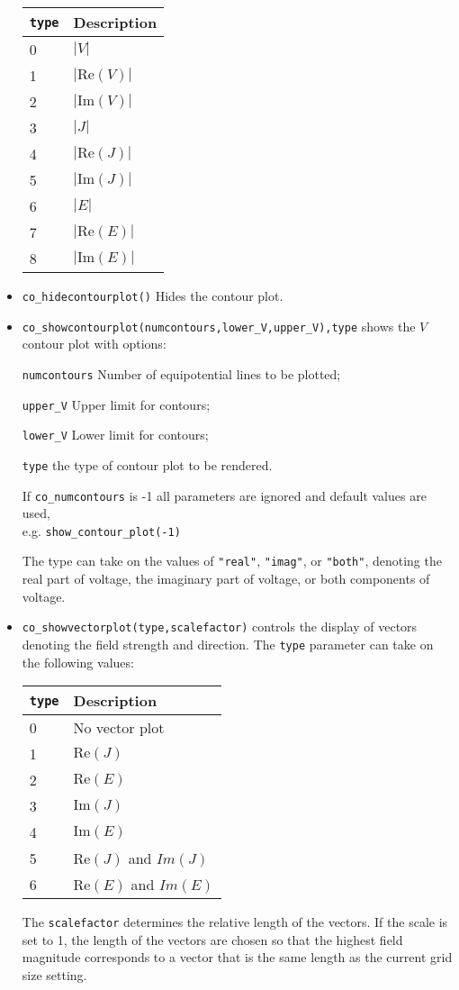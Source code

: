 \begin{itemize}
\begin{tabular}{ll}
\texttt{type} &  Description  \\ \hline
0 & $|V|$		\\
1 & $| \mbox{Re}(V)|$	\\
2 & $| \mbox{Im}(V)|$	\\
3 & $|J|$		\\
4 & $|\mbox{Re}(J)|$	\\
5 & $|\mbox{Im}(J)|$	\\
6 & $|E|$		\\
7 & $|\mbox{Re}(E)|$	\\
8 & $|\mbox{Im}(E)|$
\end{tabular}

\item \texttt{co\_hidecontourplot()} Hides the contour plot.

\item \texttt{co\_showcontourplot(numcontours,lower{\_}V,upper{\_}V),type} shows the
$V$ contour plot with options:

\texttt{numcontours} Number of equipotential lines to be plotted;

\texttt{upper{\_}V} Upper limit for contours;

\texttt{lower{\_}V} Lower limit for contours; 

\texttt{type} the type of contour plot to be rendered.

If \texttt{co\_numcontours} is -1 all parameters are ignored and
default values are used, \\ e.g. \texttt{show{\_}contour{\_}plot(-1)}

The type can take on the values of {\tt "real"}, {\tt "imag"}, or {\tt "both"}, denoting
the real part of voltage, the imaginary part of voltage, or both components of voltage.

\item \texttt{co\_showvectorplot(type,scalefactor)}
controls the display of vectors denoting the field strength and
direction. The \texttt{type} parameter can take on the following values:

\begin{tabular}{ll}
\texttt{type} &  Description  \\ \hline
0 & No vector plot \\
1 & $\mbox{Re}(J)$ \\
2 & $\mbox{Re}(E)$ \\
3 & $\mbox{Im}(J)$ \\
4 & $\mbox{Im}(E)$ \\
5 & $\mbox{Re}(J)$ and $Im(J)$ \\
6 & $\mbox{Re}(E)$ and $Im(E)$
\end{tabular}
The \texttt{scalefactor}
determines the relative length of the vectors. If the scale is set
to 1, the length of the vectors are chosen so that the highest field
magnitude corresponds to a vector that is the same length as the
current grid size setting.


\end{itemize}
